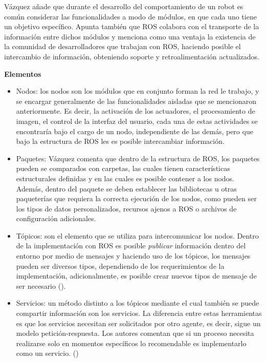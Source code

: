             Vázquez añade que durante el desarrollo del comportamiento de un robot es común considerar las funcionalidades a modo de módulos, en que cada uno tiene un objetivo específico. Apunta también que ROS colabora con el transporte de la información entre dichos módulos y menciona como una ventaja la existencia de la comunidad de desarrolladores que trabajan con ROS, haciendo posible el intercambio de información, obteniendo soporte y retroalimentación actualizados. \phantom{saltodelineaforzado >:D\\}

            \textbf{Elementos}
            \begin{itemize}
                \item Nodos: los nodos son los módulos que en conjunto forman la red le trabajo, y se encargar generalmente de las funcionalidades aisladas que se mencionaron anteriormente. Es decir, la activación de los actuadores, el procesamiento de imagen, el control de la interfaz del usuario, cada una de estas actividades se encontraría bajo el cargo de un nodo, independiente de las demás, pero que bajo la estructura de ROS les es posible intercambiar información.
                \item Paquetes: Vázquez comenta que dentro de la estructura de ROS, los paquetes pueden se comparados con carpetas, las cuales tienen características estructurales definidas y en las cuales es posible contener a los nodos. Además, dentro del paquete se deben establecer las bibliotecas u otras paqueterías que requiera la correcta ejecución de los nodos, como pueden ser los tipos de datos personalizados, recursos ajenos a ROS o archivos de configuración adicionales. 
                \item Tópicos: son el elemento que se utiliza para intercomunicar los nodos. Dentro de la implementación con ROS es posible \textit{publicar} información dentro del entorno por medio de mensajes y haciendo uso de los tópicos, los mensajes pueden ser diversos tipos, dependiendo de los requerimientos de la implementación, adicionalmente, es posible crear nuevos tipos de mensaje de ser necesario (\cite*{ros_wiki_std_msgs}). 
                \item Servicios: un método distinto a los tópicos mediante el cual también se puede compartir información son los servicios. La diferencia entre estas herramientas es que los servicios necesitan ser solicitados por otro agente, es decir, sigue un modelo petición-respuesta. Los autores comentan que si un proceso necesita realizarse solo en momentos específicos lo recomendable es implementarlo como un servicio. (\cite*{vazquez_silva_desarrollo_2018})
            \end{itemize}

